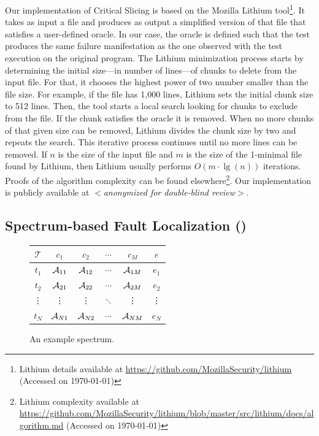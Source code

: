 \documentclass{article}
\begin{document}
Our implementation of Critical Slicing is based on the Mozilla Lithium
tool\footnote{Lithium details available at \url{https://github.com/MozillaSecurity/lithium} (Accessed on \today)}. It takes as input a file
and produces as output a simplified version of that file that
satisfies a user-defined oracle. In our case, the oracle is defined
such that the test produces the same failure manifestation as the one
observed with the test execution on the original program. The
Lithium minimization process starts by determining the initial size---in number of lines---of
chunks to delete from the input file. For that,
it chooses the highest power of two number smaller than the file
size. For example, if the file has 1,000 lines, Lithium sets the
initial chunk size to 512 lines. Then, the tool starts a local search looking
for chunks to exclude from the file. If the chunk satisfies the oracle it is removed.
When no more chunks of that given size can be removed, Lithium
divides the chunk size by two and repeats the search. This iterative
process continues until no more lines can be removed.  If $n$ is the
size of the input file and $m$ is the size of the 1-minimal file found
by Lithium, then Lithium usually performs $O(m\cdot\lg(n))$
iterations. Proofs of the algorithm complexity can be found
elsewhere\footnote{Lithium complexity available at \url{https://github.com/MozillaSecurity/lithium/blob/master/src/lithium/docs/algorithm.md} (Accessed on \today)}. Our implementation is publicly
available at \textit{$<$anonymized for double-blind review$>$}.

\subsection{Spectrum-based Fault Localization (\sfl)}
\label{sec:sfl}

\begin{figure}
  \hspace{-2ex}
  \centering
  \scriptsize
  \begin{tabular}{c|cccc|c}
    $\mathcal{T}$ & $c_1$    & $c_2$    & $\cdots$ & $c_M$    & $e$    \\ \hline
    $t_1$         & $\mathcal{A}_{11}$ & $\mathcal{A}_{12}$ & $\cdots$ & $\mathcal{A}_{1M}$ & $e_1$  \\
    $t_2$         & $\mathcal{A}_{21}$ & $\mathcal{A}_{22}$ & $\cdots$ & $\mathcal{A}_{2M}$ & $e_2$  \\
    \vdots        & \vdots   & \vdots   & $\ddots$ & \vdots   & \vdots \\
    $t_N$         & $\mathcal{A}_{N1}$ & $\mathcal{A}_{N2}$ & $\cdots$ & $\mathcal{A}_{NM}$ & $e_N$  \\
  \end{tabular}
  \caption{An example spectrum.}
  \label{fig:spectrum-example}
\end{figure}
\end{document}
